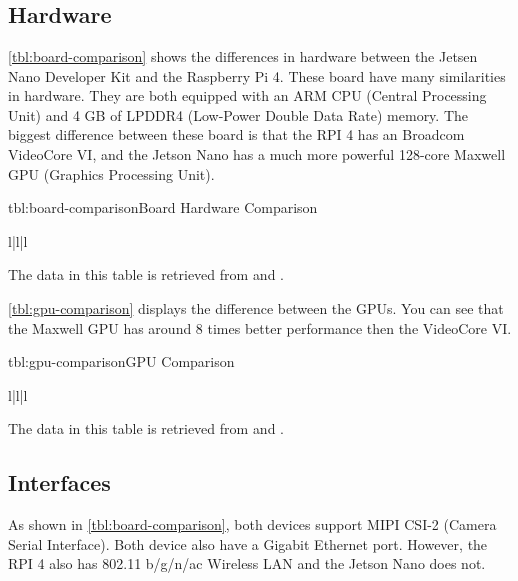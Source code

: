 \chapter{}
\label{app:board-comparison}

\section{Hardware}

\cref{tbl:board-comparison} shows the differences in hardware between the Jetsen Nano Developer Kit and the Raspberry Pi 4.
These board have many similarities in hardware. They are both equipped with an ARM CPU (Central Processing Unit) and 4 GB of LPDDR4 (Low-Power Double Data Rate) memory.
The biggest difference between these board is that the RPI 4 has an Broadcom VideoCore VI, and the Jetson Nano has a much more powerful 128-core Maxwell GPU (Graphics Processing Unit).

\begin{lintable}{tbl:board-comparison}{Board Hardware Comparison}
    \begin{lintabular}{l|l|l}
    \end{lintabular}
\end{lintable}

The data in this table is retrieved from \cite{nvidia:jetson-nano-datasheet} and \cite{rpiltd:raspberry-pi-datasheet}.

\cref{tbl:gpu-comparison} displays the difference between the GPUs.
You can see that the Maxwell GPU has around 8 times better performance then the VideoCore VI.

\begin{lintable}{tbl:gpu-comparison}{GPU Comparison}
    \begin{lintabular}{l|l|l}
    \end{lintabular}
\end{lintable}

The data in this table is retrieved from \cite{nvidia:jetson-nano-datasheet} and \cite{gdgtvs:videocore-vi-benchmark}.

\section{Interfaces}
\label{sec:board-comparison-interfaces}

As shown in \cref{tbl:board-comparison}, both devices support MIPI CSI-2 (Camera Serial Interface).
Both device also have a Gigabit Ethernet port. However, the RPI 4 also has 802.11 b/g/n/ac Wireless LAN and the Jetson Nano does not.
